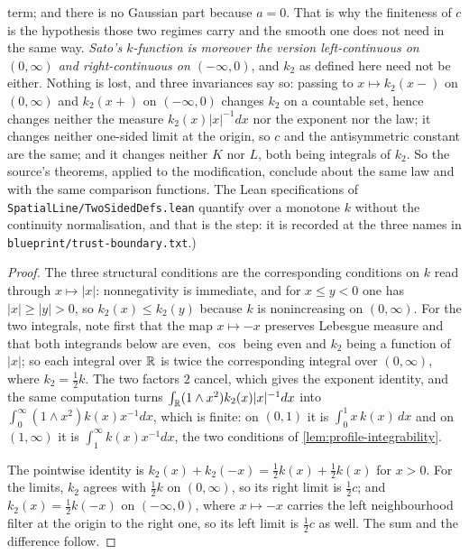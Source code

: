 \begin{lemma}
{term; and there is no Gaussian part because $a = 0$. That is why the finiteness of $c$ is the
hypothesis those two regimes carry and the smooth one does not need in the same way.
\emph{Sato's $k$-function is moreover the version left-continuous on $(0,\infty)$ and
right-continuous on $(-\infty,0)$}, and $k_2$ as defined here need not be either. Nothing is lost,
and three invariances say so: passing to $x \mapsto k_2(x{-})$ on $(0,\infty)$ and $k_2(x{+})$ on
$(-\infty,0)$ changes $k_2$ on a countable set, hence changes neither the \Levy{} measure
$k_2(x)|x|^{-1}dx$ nor the exponent nor the law; it changes neither one-sided limit at the origin,
so $c$ and the antisymmetric constant are the same; and it changes neither $K$ nor $L$, both being
integrals of $k_2$. So the source's theorems, applied to the modification, conclude about the same
law and with the same comparison functions. The Lean specifications of
\texttt{SpatialLine/TwoSidedDefs.lean} quantify over a monotone $k$ without the continuity
normalisation, and that is the step: it is recorded at the three names in
\texttt{blueprint/trust-boundary.txt}.)}
\end{lemma}

\begin{proof}
\leanok
The three structural conditions are the corresponding conditions on $k$ read through
$x \mapsto |x|$: nonnegativity is immediate, and for $x \le y < 0$ one has $|x| \ge |y| > 0$, so
$k_2(x) \le k_2(y)$ because $k$ is nonincreasing on $(0,\infty)$. For the two integrals, note
first that the map $x \mapsto -x$ preserves Lebesgue measure and that both integrands below are
even, $\cos$ being even and $k_2$ being a function of $|x|$; so each integral over $\mathbb{R}$ is
twice the corresponding integral over $(0,\infty)$, where $k_2 = \tfrac12 k$. The two factors
$2$ cancel, which gives the exponent identity, and the same computation turns
$\int_{\mathbb{R}} (1 \wedge x^2)k_2(x)|x|^{-1}dx$ into $\int_0^\infty (1 \wedge x^2)k(x)x^{-1}dx$, which
is finite: on $(0,1)$ it is $\int_0^1 x\,k(x)\,dx$ and on $(1,\infty)$ it is
$\int_1^\infty k(x)x^{-1}dx$, the two conditions of \ref{lem:profile-integrability}.

The pointwise identity is $k_2(x) + k_2(-x) = \tfrac12 k(x) + \tfrac12 k(x)$ for $x > 0$. For the
limits, $k_2$ agrees with $\tfrac12 k$ on $(0,\infty)$, so its right limit is $\tfrac12 c$; and
$k_2(x) = \tfrac12 k(-x)$ on $(-\infty,0)$, where $x \mapsto -x$ carries the left neighbourhood
filter at the origin to the right one, so its left limit is $\tfrac12 c$ as well. The sum and
the difference follow.
\end{proof}

